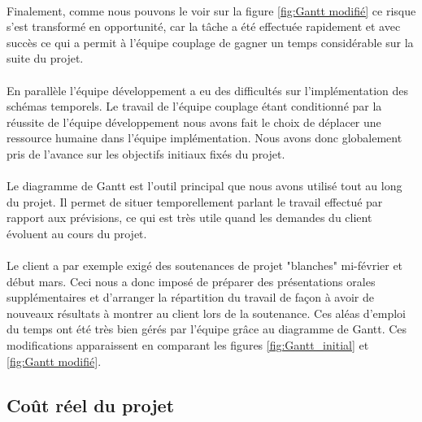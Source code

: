         \paragraph{}
        Finalement, comme nous pouvons le voir sur la figure \ref{fig:Gantt modifié} ce risque s'est transformé en opportunité, car la tâche a été effectuée rapidement et avec succès ce qui a permit à l'équipe couplage de gagner un temps considérable sur la suite du projet.

        \paragraph{}
        En parallèle l'équipe développement a eu des difficultés sur l'implémentation des schémas temporels. Le travail de l'équipe couplage étant conditionné par la réussite de l'équipe développement nous avons fait le choix de déplacer une ressource humaine dans l'équipe implémentation. Nous avons donc globalement pris de l'avance sur les objectifs initiaux fixés du projet. 

        \paragraph{}
        Le diagramme de Gantt est l'outil principal que nous avons utilisé tout au long du projet. Il permet de situer temporellement parlant le travail effectué par rapport aux prévisions, ce qui est très utile quand les demandes du client évoluent au cours du projet.

        \paragraph{}
        Le client a par exemple exigé des soutenances de projet "blanches" mi-février et début mars. Ceci nous a donc imposé de préparer des présentations orales supplémentaires et d'arranger la répartition du travail de façon à avoir de nouveaux  résultats à montrer au client lors de la soutenance. Ces aléas d'emploi du temps ont été très bien gérés par l'équipe grâce au diagramme de Gantt. Ces modifications apparaissent en comparant les figures \ref{fig:Gantt_initial} et \ref{fig:Gantt modifié}.


\subsection{Coût réel du projet}

